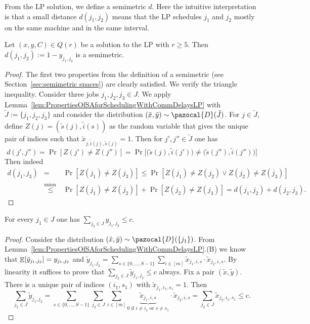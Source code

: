 From the LP solution, we define a semimetric $d$. Here the intuitive interpretation is that
a small distance $d(j_1,j_2)$ means that the LP schedules $j_1$ and $j_2$ mostly on the same machine and in the same interval. 
\begin{lemma}\label{lem:metric}
Let $(x,y,C) \in Q(r)$ be a solution to the LP with $r \geq 5$. Then $d(j_1,j_2) := 1-y_{j_1,j_2}$ is a semimetric.
\end{lemma}
\begin{proof}
  The first two properties from the definition of a semimetric (see Section~\ref{sec:semimetric spaces}) are clearly satisfied. We verify the triangle inequality.
  Consider three jobs $j_1,j_2,j_3 \in J$. We apply Lemma~\ref{lem:PropertiesOfSAforSchedulingWithCommDelaysLP} with $\tilde{J} := \{ j_1,j_2,j_3\}$
  and consider the distribution $(\tilde{x},\tilde{y}) \sim \pazocal{D}(\tilde{J})$.
  For $j \in \tilde{J}$, define $Z(j) = (\tilde{s}(j),\tilde{i}(s))$ as the random variable that gives the unique pair of indices such that $\tilde{x}_{j,\tilde{i}(j),\tilde{s}(j)}=1$.
  Then for $j',j'' \in \tilde{J}$ one has
  \[
   d(j',j'') = \Pr[Z(j') \neq Z(j'')] = \Pr\big[ \big(\tilde{s}(j),\tilde{i}(j')\big) \neq \big(\tilde{s}(j''),\tilde{i}(j'')\big)\big]
 \]
  Then indeed
  \begin{eqnarray*}
    d(j_1,j_3) &=& \Pr[Z(j_1) \neq Z(j_3)] \leq \Pr[Z(j_1) \neq Z(j_2) \vee Z(j_2) \neq Z(j_3)] \\
                   &\stackrel{\textrm{union bound}}{\leq}& \Pr[Z(j_1) \neq Z(j_2)] + \Pr[Z(j_2) \neq Z(j_3)] = d(j_1,j_2) + d(j_2,j_3).
 \end{eqnarray*}
\end{proof}

\begin{lemma}\label{lem:clustercapacity}
For every $j_1 \in J$ one has $\sum_{j_2 \in J} y_{j_1,j_2} \leq c$.
\end{lemma}
\begin{proof}
  Consider the distribution $(\tilde{x},\tilde{y}) \sim \pazocal{D}(\{ j_1\})$.
  From Lemma~\ref{lem:PropertiesOfSAforSchedulingWithCommDelaysLP}.(B)
  we know that $\mathop{\mathbb{E}}[\tilde{y}_{j_1,j_2}] = y_{j_1,j_2}$
  and $\tilde{y}_{j_1,j_2} = \sum_{s \in \{0,\ldots,S-1\}}\sum_{i \in [m]} \tilde{x}_{j_1,i,s} \cdot \tilde{x}_{j_2,i,s}$.
  By linearity it suffices to prove that $\sum_{j_2 \in J} \tilde{y}_{j_1,j_2} \leq c$ always.
  Fix a pair $(\tilde{x},\tilde{y})$.
  There is a unique pair of indices $(i_1,s_1)$ with $\tilde{x}_{j_1,i_1,s_1}=1$. Then 
  \[
    \sum_{j_2 \in J}\tilde{y}_{j_1,j_2} = \sum_{s \in \{ 0,\ldots,S-1\}}\sum_{j_2 \in J} \sum_{i \in [m]} \underbrace{\tilde{x}_{j_1,i,s}}_{0\textrm{ if }i \neq i_1\textrm{ or }s \neq s_1} \cdot \tilde{x}_{j_2,i,s}
    = \sum_{j_2 \in J} \tilde{x}_{j_2,i_1,s_1} \leq c.
  \] 
\end{proof}

